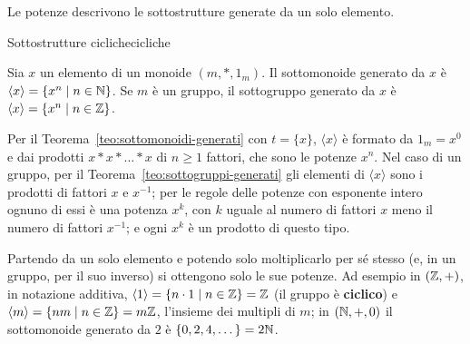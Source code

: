 
Le potenze descrivono le sottostrutture generate da un solo elemento.

\begin{concetto}
\begin{Proposizione}{Sottostrutture cicliche}{cicliche}
    \begin{prerequisiti}
    \end{prerequisiti}
    Sia $x$ un elemento di un monoide $(m, *, 1_m)$. Il sottomonoide generato da $x$ è $\langle x \rangle = \{x^n \mid n \in \mathbb{N}\}$.
    Se $m$ è un gruppo, il sottogruppo generato da $x$ è $\langle x \rangle = \{x^n \mid n \in \mathbb{Z}\}$.
\end{Proposizione}
\begin{dimostrazione}
    Per il Teorema~\ref{teo:sottomonoidi-generati} con $t = \{x\}$, $\langle x \rangle$ è formato da $1_m = x^0$ e dai prodotti
    $x * x * \dots * x$ di $n \geq 1$ fattori, che sono le potenze $x^n$. Nel caso di un gruppo, per il
    Teorema~\ref{teo:sottogruppi-generati} gli elementi di $\langle x \rangle$ sono i prodotti di fattori $x$ e $x^{-1}$; per le regole delle
    potenze con esponente intero ognuno di essi è una potenza $x^k$, con $k$ uguale al numero di fattori $x$ meno il numero di fattori
    $x^{-1}$; e ogni $x^k$ è un prodotto di questo tipo.
\end{dimostrazione}
\end{concetto}

\begin{spiegazione}
    Partendo da un solo elemento e potendo solo moltiplicarlo per sé stesso (e, in un gruppo, per il suo inverso) si ottengono
    solo le sue potenze. Ad esempio in $(\mathbb{Z}, +)$, in notazione additiva, $\langle 1 \rangle = \{n \cdot 1 \mid n \in \mathbb{Z}\} = \mathbb{Z}$ (il
    gruppo è \textbf{ciclico}) e $\langle m \rangle = \{nm \mid n \in \mathbb{Z}\} = m\mathbb{Z}$, l'insieme dei multipli di $m$; in $(\mathbb{N}, +, 0)$
    il sottomonoide generato da $2$ è $\{0, 2, 4, \dots\} = 2\mathbb{N}$.
\end{spiegazione}

